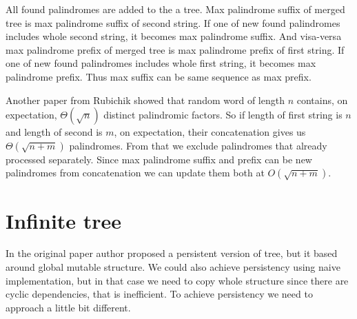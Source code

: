 All found palindromes are added to the a tree. Max palindrome suffix of merged tree is max palindrome suffix of second string. If one of new found palindromes includes whole second string, it becomes max palindrome suffix. And visa-versa max palindrome prefix of merged tree is max palindrome prefix of first string. If one of new found palindromes includes whole first string, it becomes max palindrome prefix. Thus max suffix can be same sequence as max prefix. 

Another paper from Rubichik \cite{rubinchik2016number} showed that random word of length $n$ contains, on expectation, $\Theta(\sqrt{n})$ distinct palindromic factors. So if length of first string is $n$ and length of second is $m$, on expectation, their concatenation gives us $\Theta(\sqrt{n + m})$ palindromes. From that we exclude palindromes that already processed separately. Since max palindrome suffix and prefix can be new palindromes from concatenation we can update them both at $O(\sqrt{n + m})$.   
\section{Infinite tree}
In the original paper author proposed a persistent version of tree, but it based around global mutable structure. We could also achieve persistency using naive implementation, but in that case we need to copy whole structure since there are cyclic dependencies, that is inefficient. To achieve persistency we need to approach a little bit different. 

